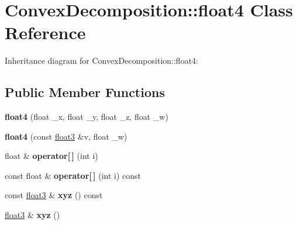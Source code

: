 \hypertarget{class_convex_decomposition_1_1float4}{\section{Convex\+Decomposition\+:\+:float4 Class Reference}
\label{class_convex_decomposition_1_1float4}
}


Inheritance diagram for Convex\+Decomposition\+:\+:float4\+:
\subsection*{Public Member Functions}
\begin{DoxyCompactItemize}
\item 
\hypertarget{class_convex_decomposition_1_1float4_a9c3642d1f19beda169f46fe01365ff11}{{\bfseries float4} (float \+\_\+x, float \+\_\+y, float \+\_\+z, float \+\_\+w)}\label{class_convex_decomposition_1_1float4_a9c3642d1f19beda169f46fe01365ff11}

\item 
\hypertarget{class_convex_decomposition_1_1float4_af943f4ed7e2b80ff5f21dcd8a8738320}{{\bfseries float4} (const \hyperlink{class_convex_decomposition_1_1float3}{float3} \&v, float \+\_\+w)}\label{class_convex_decomposition_1_1float4_af943f4ed7e2b80ff5f21dcd8a8738320}

\item 
\hypertarget{class_convex_decomposition_1_1float4_ac6122ab9efcd8e7829e0070eec07c7b7}{float \& {\bfseries operator\mbox{[}$\,$\mbox{]}} (int i)}\label{class_convex_decomposition_1_1float4_ac6122ab9efcd8e7829e0070eec07c7b7}

\item 
\hypertarget{class_convex_decomposition_1_1float4_a968f721ccd9d8f53c23e5b5e2a4740f9}{const float \& {\bfseries operator\mbox{[}$\,$\mbox{]}} (int i) const }\label{class_convex_decomposition_1_1float4_a968f721ccd9d8f53c23e5b5e2a4740f9}

\item 
\hypertarget{class_convex_decomposition_1_1float4_a9e7235a68111457395daf8304087ef49}{const \hyperlink{class_convex_decomposition_1_1float3}{float3} \& {\bfseries xyz} () const }\label{class_convex_decomposition_1_1float4_a9e7235a68111457395daf8304087ef49}

\item 
\hypertarget{class_convex_decomposition_1_1float4_aa7831e4c32f0d834551c31b48cf5ef2c}{\hyperlink{class_convex_decomposition_1_1float3}{float3} \& {\bfseries xyz} ()}\label{class_convex_decomposition_1_1float4_aa7831e4c32f0d834551c31b48cf5ef2c}

\end{DoxyCompactItemize}
